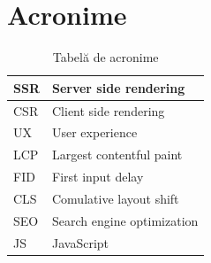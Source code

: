 \documentclass[12pt, a4paper]{report}
\begin{document}
\section{Acronime}

\begin{table} [H]
	\begin{tabular} {|  l | L{10cm} |}
		\hline
		SSR & Server side rendering      \\ [0.2ex]
		\hline
		CSR & Client side rendering      \\ [0.2ex]
		\hline
		UX  & User experience            \\ [0.2ex]
		\hline
		LCP & Largest contentful paint   \\  [0.2ex]
		\hline
		FID & First input delay          \\ [0.2ex]
		\hline
		CLS & Comulative layout shift    \\ [0.2ex]
		\hline
		SEO & Search engine optimization \\ [0.2ex]
		\hline
		JS  & JavaScript                 \\ [0.2ex]
		\hline
	\end{tabular}
	\caption{Tabelă de acronime}
	\label{table:acron}
\end{table}

\end{document}
